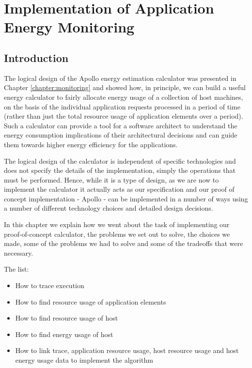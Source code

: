 \chapter{Implementation of Application Energy Monitoring}
\label{chapter:implementation}

\section{Introduction}
The logical design of the Apollo energy estimation calculator was presented in Chapter \ref{chapter:monitoring} and showed how, in principle, we can build a useful energy calculator to fairly allocate energy usage of a collection of host machines, on the basis of the individual application requests processed in a period of time (rather than just the total resource usage of application elements over a period).   Such a calculator can provide a tool for a software architect to understand the energy consumption implications of their architectural decisions and can guide them towards higher energy efficiency for the applications.

The logical design of the calculator is independent of specific technologies and does not specify the details of the implementation, simply the operations that must be performed.  Hence, while it is a type of design, as we are now to implement the calculator it actually acts as our specification and our proof of concept implementation - Apollo - can be implemented in a number of ways using a number of different technology choices and detailed design decisions.

In this chapter we explain how we went about the task of implementing our proof-of-concept calculator, the problems we set out to solve, the choices we made, some of the problems we had to solve and some of the tradeoffs that were necessary.

The list:
\begin{itemize}
	\item How to trace execution
	\item How to find resource usage of application elements
	\item How to find resource usage of host
	\item How to find energy usage of host
	\item How to link trace, application resource usage, host resource usage and host energy usage data to implement the algorithm
\end{itemize}


